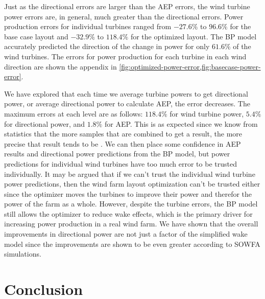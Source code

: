 \documentclass[conf]{new-aiaa}
\begin{document}
Just as the directional errors are larger than the AEP errors, the wind turbine power errors are, in general, much greater than the directional errors. Power production errors for individual turbines ranged from $-27.6\%$ to $96.6\%$ for the base case layout and $-32.9\%$ to $118.4\%$ for the optimized layout. The BP model accurately predicted the direction of the change in power for only $61.6\%$ of the wind turbines. The errors for power production for each turbine in each wind direction are shown the appendix in \cref{fig:optimized-power-error,fig:basecase-power-error}.

We have explored that each time we average turbine powers to get directional power, or average directional power to calculate AEP, the error decreases. The maximum errors at each level are as follows: $118.4\%$ for wind turbine power, $5.4\%$ for directional power, and $1.8\%$ for AEP. This is as expected since we know from statistics that the more samples that are combined to get a result, the more precise that result tends to be \cite{stats book}. We can then place some confidence in AEP results and directional power predictions from the BP model, but power predictions for individual wind turbines have too much error to be trusted individually. It may be argued that if we can't trust the individual wind turbine power predictions, then the wind farm layout optimization can't be trusted either since the optimizer moves the turbines to improve their power and therefor the power of the farm as a whole. However, despite the turbine errors, the BP model still allows the optimizer to reduce wake effects, which is the primary driver for increasing power production in a real wind farm. We have shown that the overall improvements in directional power are not just a factor of the simplified wake model since the improvements are shown to be even greater according to SOWFA simulations.

\section{Conclusion}




\end{document}
